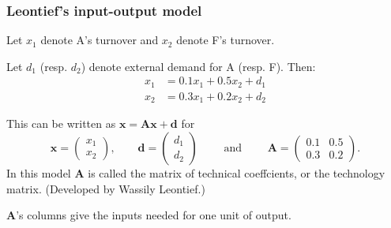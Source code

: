 \documentclass[dvips, %
               xcolor=pst,
               hyperref={colorlinks=false,
               dvips,
               citecolor=magenta,menucolor=cyan,
               bookmarks,bookmarksopen,pdfpagemode=UseThumbs}
              ]{beamer}
\renewcommand{\red}{}
\renewcommand{\blue}{}}{\newcommand{\emphy}{}}
\begin{document}
\begin{frame}[fragile]\frametitle{Leontief's input-output model}

Let $x_1$ denote A's turnover and $x_2$ denote F's turnover.

\medskip
Let $d_1$ (resp. $d_2$) denote external demand for A (resp. F).
Then:
\begin{align*}
x_1 & = 0.1 x_1 + 0.5 x_2 + d_1
\\
x_2 & = 0.3 x_1 + 0.2 x_2 + d_2
\end{align*}

\pause
This can be written as
$\boldsymbol{x} = \boldsymbol{A}\boldsymbol{x}+\boldsymbol{d}$
for
\[
\boldsymbol{x} = \left(\begin{array}{r}
x_1 \\ x_2
\end{array}\right),
\qquad
\boldsymbol{d} = \left(\begin{array}{r}
d_1 \\ d_2
\end{array}\right)
\qquad\text{ and }\qquad
\boldsymbol{A} = \left(\begin{array}{rr}
0.1 & 0.5 \\ 0.3 & 0.2
\end{array}\right).
\]
\pause
In this model $\boldsymbol{A}$ is called the {\red matrix of technical coeffcients}, or 
the {\blue technology matrix}. (Developed by Wassily Leontief.)

\pause\medskip
$\boldsymbol{A}$'s columns give the inputs needed for one unit of output.

\end{frame}
\end{document}
